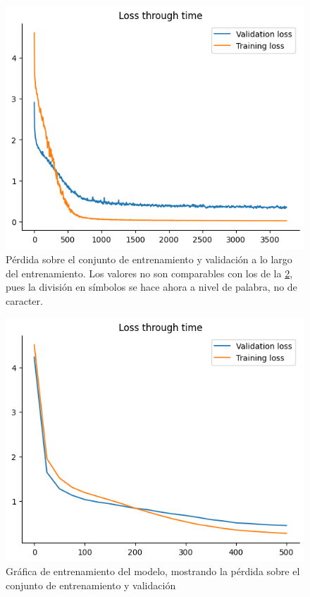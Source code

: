 \begin{figure}[tb]
    \centering
    \includegraphics[scale=0.5]{figures/chapter5/loss_big.png}
    \caption{Pérdida sobre el conjunto de entrenamiento y validación a lo largo del entrenamiento. Los valores no son comparables con los de la \cref{fig:loss}, pues la división en símbolos se hace ahora a nivel de palabra, no de caracter. }
    \label{fig:loss_big}
\end{figure}
\begin{figure}[tb]
    \centering
    \includegraphics[scale=0.5]{figures/chapter5/loss.png}
    \caption{Gráfica de entrenamiento del modelo, mostrando la pérdida sobre el conjunto de entrenamiento y validación}
    \label{fig:loss}
\end{figure}


